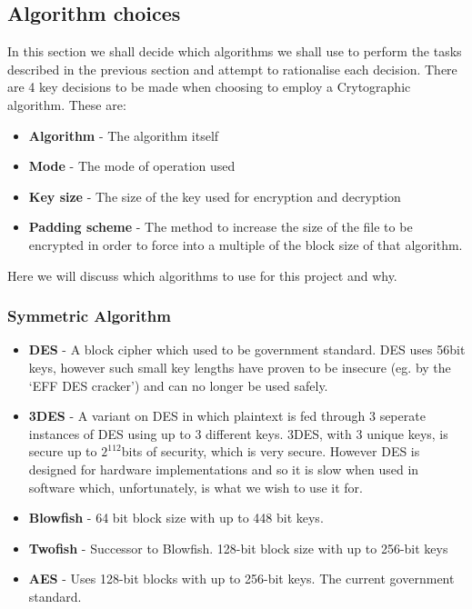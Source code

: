 \documentclass[12pt, titlepage]{article}
\begin{document}
\subsection{Algorithm choices}
In this section we shall decide which algorithms we shall use to perform the tasks described in the previous section and attempt to rationalise each decision.
\newline \indent There are 4 key decisions to be made when choosing to employ a Crytographic algorithm. These are:
\begin{itemize}
	\item \textbf{Algorithm} - The algorithm itself
	\item \textbf{Mode} - The mode of operation used
	\item \textbf{Key size} - The size of the key used for encryption and decryption
	\item \textbf{Padding scheme} - The method to increase the size of the file to be encrypted in order to force into a multiple of the block size of that algorithm.
\end{itemize}
Here we will discuss which algorithms to use for this project and why.

\subsubsection{Symmetric Algorithm}
\begin{itemize}
	\item \textbf{DES} - A block cipher which used to be government standard. DES uses 56bit keys, however such small key lengths have proven to be insecure (eg. by the `EFF DES cracker') and can no longer be used safely.
	\item \textbf{3DES} - A variant on DES in which plaintext is fed through 3 seperate instances of DES using up to 3 different keys. 3DES, with 3 unique keys, is secure up to $2^112$bits of security, which is very secure. However DES is designed for hardware implementations and so it is slow when used in software which, unfortunately, is what we wish to use it for.
	\item \textbf{Blowfish} - 64 bit block size with up to 448 bit keys.
	\item \textbf{Twofish} - Successor to Blowfish. 128-bit block size with up to 256-bit keys
	\item \textbf{AES} - Uses 128-bit blocks with up to 256-bit keys. The current government standard.
\end{itemize}
\end{document}
